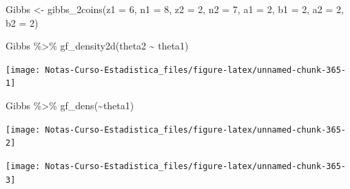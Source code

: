 \documentclass[
  12pt,
]{book}
\newenvironment{Shaded}{\begin{snugshade}}{\end{snugshade}}
\newcommand{\AttributeTok}[1]{\textcolor[rgb]{0.77,0.63,0.00}{#1}}
\newcommand{\DecValTok}[1]{\textcolor[rgb]{0.00,0.00,0.81}{#1}}
\newcommand{\FunctionTok}[1]{\textcolor[rgb]{0.00,0.00,0.00}{#1}}
\newcommand{\NormalTok}[1]{#1}
\newcommand{\OtherTok}[1]{\textcolor[rgb]{0.56,0.35,0.01}{#1}}
\newcommand{\SpecialCharTok}[1]{\textcolor[rgb]{0.00,0.00,0.00}{#1}}
\theoremstyle{definition}
\theoremstyle{definition}
\theoremstyle{definition}
\theoremstyle{definition}
\theoremstyle{remark}
\begin{document}
\begin{Shaded}
\begin{Highlighting}[]
\NormalTok{Gibbs }\OtherTok{\textless{}{-}} \FunctionTok{gibbs\_2coins}\NormalTok{(}\AttributeTok{z1 =} \DecValTok{6}\NormalTok{, }\AttributeTok{n1 =} \DecValTok{8}\NormalTok{, }\AttributeTok{z2 =} \DecValTok{2}\NormalTok{, }\AttributeTok{n2 =} \DecValTok{7}\NormalTok{,}
    \AttributeTok{a1 =} \DecValTok{2}\NormalTok{, }\AttributeTok{b1 =} \DecValTok{2}\NormalTok{, }\AttributeTok{a2 =} \DecValTok{2}\NormalTok{, }\AttributeTok{b2 =} \DecValTok{2}\NormalTok{)}

\NormalTok{Gibbs }\SpecialCharTok{\%\textgreater{}\%}
    \FunctionTok{gf\_density2d}\NormalTok{(theta2 }\SpecialCharTok{\textasciitilde{}}\NormalTok{ theta1)}
\end{Highlighting}
\end{Shaded}

\begin{center}\texttt{[image: Notas-Curso-Estadistica\_files/figure-latex/unnamed-chunk-365-1]} \end{center}

\begin{Shaded}
\begin{Highlighting}[]
\NormalTok{Gibbs }\SpecialCharTok{\%\textgreater{}\%}
    \FunctionTok{gf\_dens}\NormalTok{(}\SpecialCharTok{\textasciitilde{}}\NormalTok{theta1)}
\end{Highlighting}
\end{Shaded}

\begin{center}\texttt{[image: Notas-Curso-Estadistica\_files/figure-latex/unnamed-chunk-365-2]} \end{center}

\begin{Shaded}
\end{Shaded}

\begin{center}\texttt{[image: Notas-Curso-Estadistica\_files/figure-latex/unnamed-chunk-365-3]} \end{center}
\end{document}
